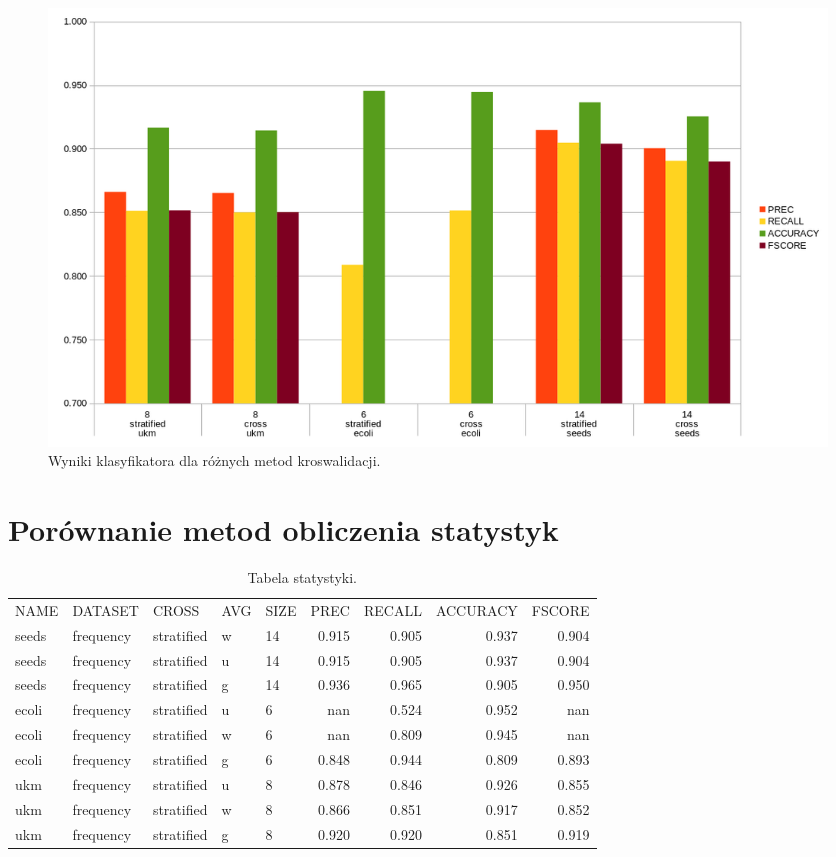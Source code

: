 \begin{figure}[H]
	\centering
		\includegraphics[width=1.0\linewidth]{cross.png}
	\caption[Wyniki klasyfikatora dla różnych metod kroswalidacji.]{Wyniki klasyfikatora dla różnych metod kroswalidacji.}
	\label{fig:cross}
\end{figure}



\section{Porównanie metod obliczenia statystyk}

\begin{table}[H]
\centering
\caption{Tabela statystyki.}
\label{table-stats}
\begin{tabular}{lllllrrrr}
NAME  & DATASET   & CROSS      & AVG & SIZE & PREC  & RECALL & ACCURACY & FSCORE \\
seeds & frequency & stratified & w   & 14   & 0.915 & 0.905  & 0.937    & 0.904  \\
seeds & frequency & stratified & u   & 14   & 0.915 & 0.905  & 0.937    & 0.904  \\
seeds & frequency & stratified & g   & 14   & 0.936 & 0.965  & 0.905    & 0.950  \\
ecoli & frequency & stratified & u   & 6    & nan   & 0.524  & 0.952    & nan    \\
ecoli & frequency & stratified & w   & 6    & nan   & 0.809  & 0.945    & nan    \\
ecoli & frequency & stratified & g   & 6    & 0.848 & 0.944  & 0.809    & 0.893  \\
ukm   & frequency & stratified & u   & 8    & 0.878 & 0.846  & 0.926    & 0.855  \\
ukm   & frequency & stratified & w   & 8    & 0.866 & 0.851  & 0.917    & 0.852  \\
ukm   & frequency & stratified & g   & 8    & 0.920 & 0.920  & 0.851    & 0.919 
\end{tabular}
\end{table}

